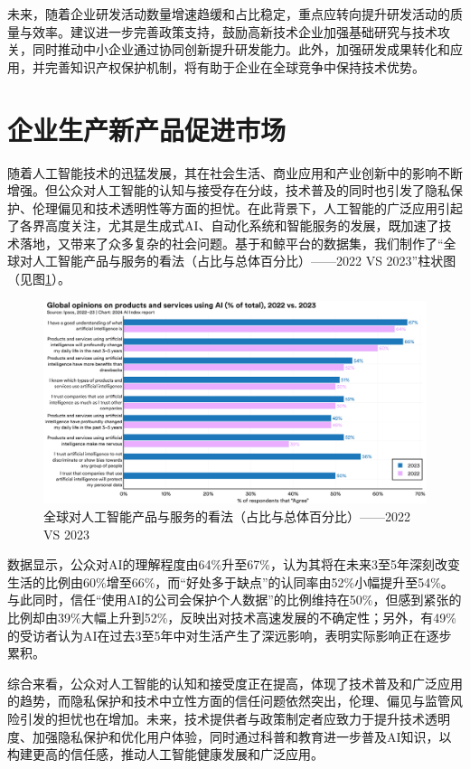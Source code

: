 未来，随着企业研发活动数量增速趋缓和占比稳定，重点应转向提升研发活动的质量与效率。建议进一步完善政策支持，鼓励高新技术企业加强基础研究与技术攻关，同时推动中小企业通过协同创新提升研发能力。此外，加强研发成果转化和应用，并完善知识产权保护机制，将有助于企业在全球竞争中保持技术优势。

\section{企业生产新产品促进市场}
随着人工智能技术的迅猛发展，其在社会生活、商业应用和产业创新中的影响不断增强。但公众对人工智能的认知与接受存在分歧，技术普及的同时也引发了隐私保护、伦理偏见和技术透明性等方面的担忧。在此背景下，人工智能的广泛应用引起了各界高度关注，尤其是生成式AI、自动化系统和智能服务的发展，既加速了技术落地，又带来了众多复杂的社会问题。基于和鲸平台的数据集，我们制作了“全球对人工智能产品与服务的看法（占比与总体百分比）——2022 VS 2023”柱状图（见图\ref{全球对人工智能产品与服务的看法（占比与总体百分比）——2022 VS 2023}）。

\begin{figure}[H]
    \centering
    \includegraphics[width=0.7\linewidth]{figure/13全球对人工智能产品与服务的看法（占比与总体百分比）——2022 VS 2023.png}
    \caption{全球对人工智能产品与服务的看法（占比与总体百分比）——2022 VS 2023}
    \label{全球对人工智能产品与服务的看法（占比与总体百分比）——2022 VS 2023}
\end{figure}

数据显示，公众对AI的理解程度由64\%升至67\%，认为其将在未来3至5年深刻改变生活的比例由60\%增至66\%，而“好处多于缺点”的认同率由52\%小幅提升至54\%。与此同时，信任“使用AI的公司会保护个人数据”的比例维持在50\%，但感到紧张的比例却由39\%大幅上升到52\%，反映出对技术高速发展的不确定性；另外，有49\%的受访者认为AI在过去3至5年中对生活产生了深远影响，表明实际影响正在逐步累积。

综合来看，公众对人工智能的认知和接受度正在提高，体现了技术普及和广泛应用的趋势，而隐私保护和技术中立性方面的信任问题依然突出\cite{Zuiderwijk2021}，伦理、偏见与监管风险引发的担忧也在增加。未来，技术提供者与政策制定者应致力于提升技术透明度、加强隐私保护和优化用户体验，同时通过科普和教育进一步普及AI知识，以构建更高的信任感，推动人工智能健康发展和广泛应用。

